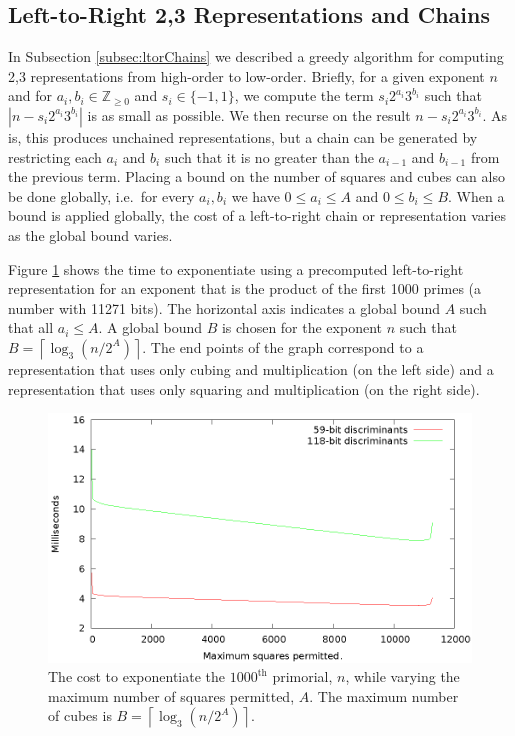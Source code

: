 \documentclass{ucalgthes1}
\theoremstyle{definition}
\newcommand{\ZZgez}{\mathbb{Z}_{\ge 0}}
\newcommand{\ceil}[1]{\left\lceil #1 \right\rceil}
\begin{document}
\subsection{Left-to-Right 2,3 Representations and Chains}
\label{subsec:ltorChains2}

In Subsection \ref{subsec:ltorChains} we described a greedy algorithm for computing 2,3 representations from high-order to low-order.  Briefly, for a given exponent $n$ and for $a_i, b_i \in \ZZgez$ and \mbox{$s_i \in \{-1, 1\}$}, we compute the term $s_i2^{a_i}3^{b_i}$ such that $\left|n-s_i2^{a_i}3^{b_i}\right|$ is as small as possible.  We then recurse on the result $n - s_i2^{a_i}3^{b_i}$.  As is, this produces unchained representations, but a chain can be generated by restricting each $a_i$ and $b_i$ such that it is no greater than the $a_{i-1}$ and $b_{i-1}$ from the previous term.  Placing a bound on the number of squares and cubes can also be done globally, i.e.\ for every $a_i, b_i$ we have $0 \le a_i \le A$ and $0 \le b_i \le B$. When a bound is applied globally, the cost of a left-to-right chain or representation varies as the global bound varies.

Figure \ref{fig:dbnsL2rVaryBounds} shows the time to exponentiate using a precomputed left-to-right representation for an exponent that is the product of the first 1000 primes (a number with 11271 bits).  The horizontal axis indicates a global bound $A$ such that all $a_i \le A$.  A global bound $B$ is chosen for the exponent $n$ such that $B = \ceil{\log_3(n/2^A)}$.  The end points of the graph correspond to a representation that uses only cubing and multiplication (on the left side) and a representation that uses only squaring and multiplication (on the right side).

\begin{figure}[H]
\centering
\includegraphics{dbns_l2r_vary_max}
\caption{The cost to exponentiate the $1000^{\textrm{th}}$ primorial, $n$, while varying the maximum number of squares permitted, $A$. The maximum number of cubes is $B = \ceil{\log_3(n/2^A)}$.}
\label{fig:dbnsL2rVaryBounds}
\end{figure}
\end{document}
